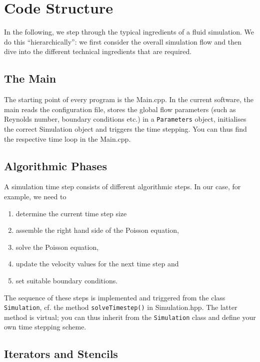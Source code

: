 \documentclass[pdftex,A4]{article}
\begin{document}
\section{Code Structure}\label{sec:code_structure}
In the following, we step through the typical ingredients of a fluid simulation.
We do this ``hierarchically'': we first consider the overall simulation flow and then dive into the different technical ingredients that are required.
 
\subsection{The Main}\label{sec:time_stepping}
The starting point of every program is the Main.cpp.
In the current software, the main reads the configuration file, stores the global flow parameters (such as Reynolds number, boundary conditions etc.)
in a {\tt Parameters} object, initialises the correct Simulation object and triggers the time stepping.
You can thus find the respective time loop in the Main.cpp.

\subsection{Algorithmic Phases}\label{sec:algorithmic_phases}
A simulation time step consists of different algorithmic steps.
In our case, for example, we need to
  \begin{enumerate}
  \item determine the current time step size
  \item assemble the right hand side of the Poisson equation,
  \item solve the Poisson equation,
  \item update the velocity values for the next time step and
  \item set suitable boundary conditions.
  \end{enumerate}
The sequence of these steps is implemented and triggered from the class {\tt Simulation}, cf. the method {\tt solveTimestep()} in Simulation.hpp.
The latter method is virtual; you can thus inherit from the {\tt Simulation} class and define your own time stepping scheme.

\subsection{Iterators and Stencils}\label{sec:iterators_and_stencils}
\end{document}

